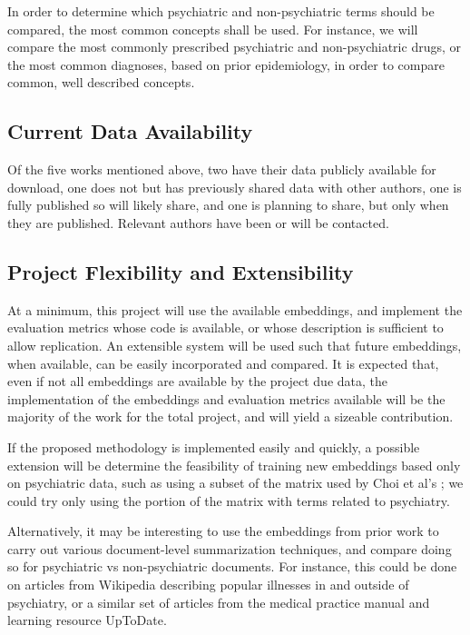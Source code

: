 \documentclass[10pt]{article}
\begin{document}
In order to determine which psychiatric and non-psychiatric terms should be compared, the most common concepts shall be used. For instance, we will compare the most commonly prescribed psychiatric and non-psychiatric drugs, or the most common diagnoses, based on prior epidemiology, in order to compare common, well described concepts.

\subsection{Current Data Availability}

Of the five works mentioned above, two have their data publicly available for download, one does not but has previously shared data with other authors, one is fully published so will likely share, and one is planning to share, but only when they are published. Relevant authors have been or will be contacted. 

\subsection{Project Flexibility and Extensibility}

At a minimum, this project will use the available embeddings, and implement the evaluation metrics whose code is available, or whose description is sufficient to allow replication. An extensible system will be used such that future embeddings, when available, can be easily incorporated and compared. It is expected that, even if not all embeddings are available by the project due data, the implementation of the embeddings and evaluation metrics available will be the majority of the work for the total project, and will yield a sizeable contribution. 

If the proposed methodology is implemented easily and quickly, a possible extension will be determine the feasibility of training new embeddings based only on psychiatric data, such as using a subset of the matrix used by Choi et al's ; we could try only using the portion of the matrix with terms related to psychiatry. 

Alternatively, it may be interesting to use the embeddings from prior work to carry out various document-level summarization techniques, and compare doing so for psychiatric vs non-psychiatric documents. For instance, this could be done on articles from Wikipedia describing popular illnesses in and outside of psychiatry, or a similar set of articles from the medical practice manual and learning resource UpToDate.
\end{document}
